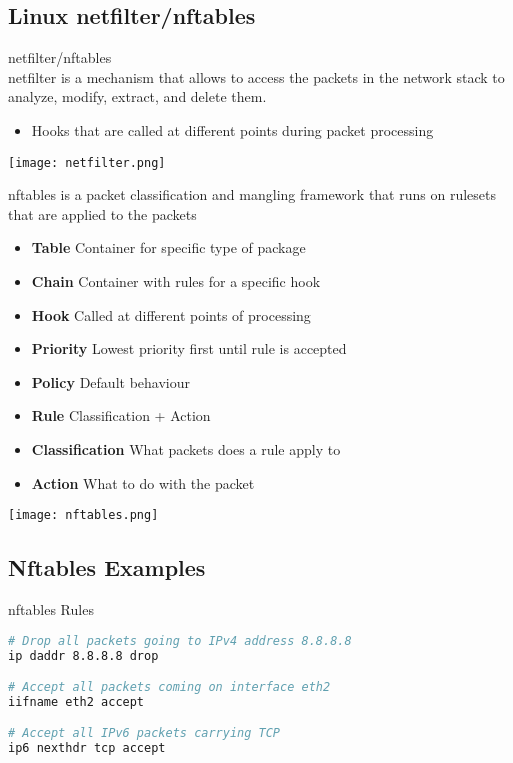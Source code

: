 
\subsection{Linux netfilter/nftables}

\begin{definition}{netfilter/nftables}\\
    netfilter is a mechanism that allows to access the packets in the network stack to analyze, modify, extract, and delete them.
    \begin{itemize}
        \item Hooks that are called at different points during packet processing
    \end{itemize}
    \texttt{[image: netfilter.png]}
    
    nftables is a packet classification and mangling framework that runs on rulesets that are applied to the packets
    \begin{itemize}
        \item \textbf{Table} Container for specific type of package
        \item \textbf{Chain} Container with rules for a specific hook
        \item \textbf{Hook} Called at different points of processing
        \item \textbf{Priority} Lowest priority first until rule is accepted
        \item \textbf{Policy} Default behaviour
        \item \textbf{Rule} Classification + Action
        \item \textbf{Classification} What packets does a rule apply to
        \item \textbf{Action} What to do with the packet
    \end{itemize}
    \texttt{[image: nftables.png]}
\end{definition}



\subsection{Nftables Examples}

\begin{examplecode}{nftables Rules}\\
\begin{lstlisting}[language=bash, style=basesmol]
# Drop all packets going to IPv4 address 8.8.8.8
ip daddr 8.8.8.8 drop

# Accept all packets coming on interface eth2
iifname eth2 accept

# Accept all IPv6 packets carrying TCP
ip6 nexthdr tcp accept
\end{lstlisting}
\end{examplecode}

